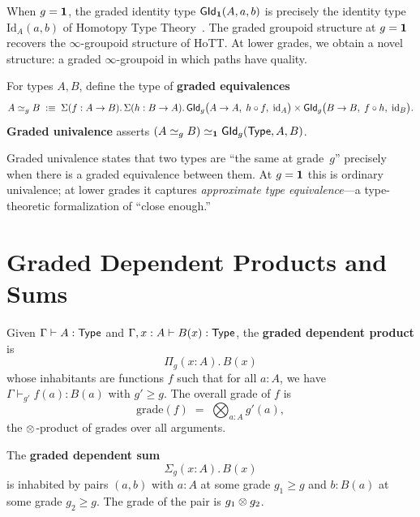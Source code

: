 \begin{remark}
When $g = \mathbf{1}$, the graded identity type $\mathsf{GId}_{\mathbf{1}}(A,a,b)$
is precisely the identity type $\mathrm{Id}_A(a,b)$ of Homotopy
Type Theory~\cite{hott2013}.  The graded groupoid structure
at $g = \mathbf{1}$ recovers the $\infty$-groupoid structure of HoTT.
At lower grades, we obtain a novel structure: a graded $\infty$-groupoid
in which paths have quality.
\end{remark}

\begin{definition}
\label{def:graded-univalence}
For types $A, B$, define the type of \textbf{graded equivalences}
\[
  A \simeq_g B \;:\equiv\;
  \Sigma(f : A \to B).\,\Sigma(h : B \to A).\,
  \mathsf{GId}_g\bigl(A \to A,\; h \circ f,\; \mathrm{id}_A\bigr)
  \times
  \mathsf{GId}_g\bigl(B \to B,\; f \circ h,\; \mathrm{id}_B\bigr).
\]
\textbf{Graded univalence} asserts
$(A \simeq_g B) \simeq_{\mathbf{1}} \mathsf{GId}_g(\mathsf{Type}, A, B)$.
\end{definition}

Graded univalence states that two types are ``the same at grade~$g$''
precisely when there is a graded equivalence between them.
At $g = \mathbf{1}$ this is ordinary univalence; at lower grades it
captures \emph{approximate type equivalence}---a type-theoretic
formalization of ``close enough.''

\section{Graded Dependent Products and Sums}
\label{sec:graded-pi-sigma}

\begin{definition}
\label{def:graded-pi}
Given $\Gamma \vdash A : \mathsf{Type}$ and $\Gamma, x : A \vdash B(x) : \mathsf{Type}$,
the \textbf{graded dependent product} is
\[
  \Pi_g(x : A).\, B(x)
\]
whose inhabitants are functions $f$ such that for all $a : A$,
we have $\Gamma \vdash_{g'} f(a) : B(a)$ with $g' \geq g$.  The
overall grade of $f$ is
\[
  \mathrm{grade}(f) \;=\; \bigotimes_{a : A} g'(a),
\]
the $\otimes$-product of grades over all arguments.
\end{definition}

\begin{definition}
\label{def:graded-sigma}
The \textbf{graded dependent sum}
\[
  \Sigma_g(x : A).\, B(x)
\]
is inhabited by pairs $(a, b)$ with $a : A$ at some grade $g_1 \geq g$
and $b : B(a)$ at some grade $g_2 \geq g$.  The grade of the pair is
$g_1 \otimes g_2$.
\end{definition}

